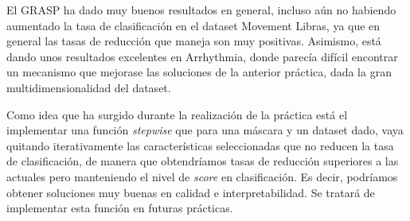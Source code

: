 \documentclass[a4paper,11pt]{article}
\begin{document}
  El GRASP ha dado muy buenos resultados en general, incluso aún no habiendo aumentado la tasa de clasificación en el 
  dataset Movement Libras, ya que en general las tasas de reducción que maneja son muy positivas. Asimismo, está dando
  unos resultados excelentes en Arrhythmia, donde parecía difícil encontrar un mecanismo que mejorase las soluciones de
  la anterior práctica, dada la gran multidimensionalidad del dataset.
  
  Como idea que ha surgido durante la realización de la práctica está el implementar una función \textit{stepwise} que para
  una máscara y un dataset dado, vaya quitando iterativamente las características seleccionadas que no reducen la tasa de
  clasificación, de manera que obtendríamos tasas de reducción superiores a las actuales pero manteniendo el nivel de 
  \textit{score} en clasificación. Es decir, podríamos obtener soluciones muy buenas en calidad e interpretabilidad. Se
  tratará de implementar esta función en futuras prácticas.
  
\end{document}
